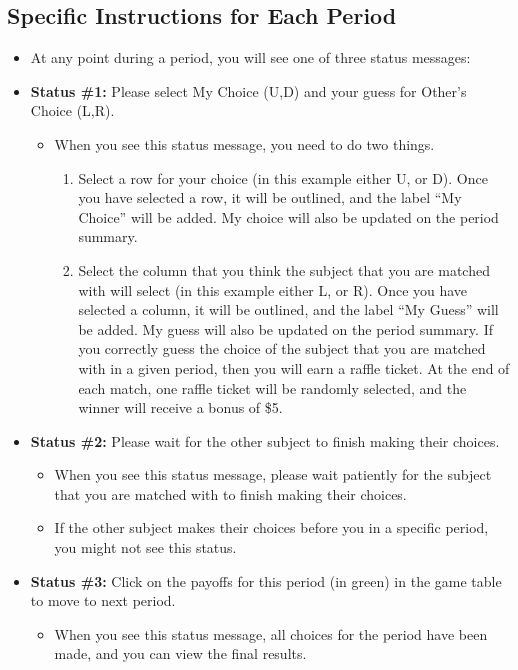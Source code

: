 \documentclass[11pt]{article}
\newcommand{\dblbkt}[1]{}
\begin{document}
\subsection*{\dblbkt{1} Specific Instructions for Each Period} 
\begin{itemize} 
\item At any point during a period, you will see one of three status messages:
\item {\bf Status \#1:} Please select My Choice (U,D) and your guess for Other's Choice (L,R).
\begin{itemize} 
\item When you see this status message, you need to do two things. 
\begin{enumerate} 
\item Select a row for your choice (in this example either U, or D).  \dblbkt{1} Once you have selected a row, it will be outlined, and the label ``My Choice'' will be added.  \dblbkt{1} My choice will also be updated on the period summary.
\item Select the column that you think the subject that you are matched with will select (in this example either L, or R). \dblbkt{1} Once you have selected a column, it will be outlined, and the label ``My Guess'' will be added.  \dblbkt{1} My guess will also be updated on the period summary.  If you correctly guess the choice of the subject that you are matched with in a given period, then you will earn a raffle ticket.  At the end of each match, one raffle ticket will be randomly selected, and the winner will receive a bonus of \$5.
\end{enumerate} 
\end{itemize} 
\item \dblbkt{1} {\bf Status \#2:} Please wait for the other subject to finish making their choices.
\begin{itemize} 
\item When you see this status message, please wait patiently for the subject that you are matched with to finish making their choices. 
\item If the other subject makes their choices before you in a specific period, you might not see this status.
\end{itemize} 
\item \dblbkt{2} {\bf Status \#3:} Click on the payoffs for this period (in green) in the game table to move to next period.
\begin{itemize} 
\item When you see this status message, all choices for the period have been made, and you can view the final results.  

\end{itemize}
\end{itemize}
\end{document}
